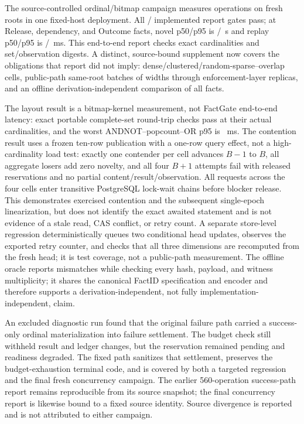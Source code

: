 \documentclass[journal,onecolumn]{IEEEtran}
\begin{document}
The source-controlled ordinal/bitmap campaign measures
\RQFourVFourSamples{} operations on \RQFourVFourRoots{} fresh roots in one
fixed-host deployment. All
\RQFourVFourGatesPassed{}/\RQFourVFourGatesTotal{} implemented report gates
pass; at \RQFourVFourReleaseFacts{} Release,
\RQFourVFourInfluenceFacts{} dependency, and \RQFourVFourOutcomeFacts{} Outcome
facts, novel p50/p95 is
\RQFourVFourNovelMedianS{}/\RQFourVFourNovelTailS{}~s and replay p50/p95 is
\RQFourVFourReplayMedianMS{}/\RQFourVFourReplayTailMS{}~ms. This end-to-end report
checks exact cardinalities and set/observation digests. A distinct,
source-bound supplement now covers the obligations that report did not imply:
\RQFourVFourDistributionCells{} dense/clustered/random-sparse--overlap cells,
public-path same-root batches of widths \RQFourVFourConcurrencyWidths{} through
\RQFourVFourConcurrencyGateways{} enforcement-layer replicas, and an offline
derivation-independent comparison of all \RQFourVFourOracleFacts{} facts.

The layout result is a bitmap-kernel measurement, not FactGate end-to-end
latency: \RQFourVFourDistributionRoundTrips{} exact portable complete-set
round-trip checks pass at their actual cardinalities, and the worst
ANDNOT--popcount--OR p95 is
\RQFourVFourDistributionWorstTailMS{}~ms. The contention result uses a frozen
ten-row publication with a one-row query effect, not a high-cardinality load
test: exactly one contender per
cell advances $B-1$ to $B$, all \RQFourVFourConcurrencyZeroNovelty{} aggregate
losers add zero novelty, and all four $B+1$ attempts fail with released
reservations and no partial content/result/observation. All
\RQFourVFourRootLockWaiters{} requests across the four cells enter transitive
PostgreSQL lock-wait chains before blocker release. This demonstrates exercised
contention and the subsequent single-epoch linearization, but does not identify
the exact awaited statement and is not evidence of a stale read, CAS conflict,
or retry count. A separate store-level regression deterministically queues two
conditional head updates, observes the exported retry counter, and checks that
all three dimensions are recomputed from the fresh head; it is test coverage,
not a public-path measurement. The offline oracle reports
\RQFourVFourOracleMismatches{} mismatches while checking every hash, payload,
and witness multiplicity; it shares the canonical FactID specification and
encoder and therefore supports a derivation-independent, not fully
implementation-independent, claim.

An excluded diagnostic run found that the original failure path carried a
success-only ordinal materialization into failure settlement. The budget check
still withheld result and ledger changes, but the reservation remained pending
and readiness degraded. The fixed path sanitizes that settlement, preserves the
budget-exhaustion terminal code, and is covered by both a targeted regression
and the final fresh concurrency campaign. The earlier 560-operation
success-path report remains reproducible from its source snapshot; the final
concurrency report is likewise bound to a fixed source identity. Source
divergence is reported and is not attributed to either campaign.
\end{document}
